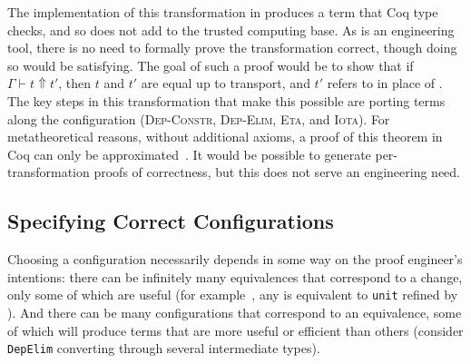 The implementation of this transformation in \toolname produces a term that Coq type checks, and so does not
add to the trusted computing base.
As \toolname is an engineering tool, there is no need to formally prove the transformation correct, though doing so would be satisfying.
The goal of such a proof would be to show that %
if $\Gamma \vdash t \Uparrow t'$,
then $t$ and $t'$ are equal up to transport, and $t'$ refers to \B in place of \A.
The key steps in this transformation that make this possible are porting terms along the configuration %
(\textsc{Dep-Constr}, \textsc{Dep-Elim}, \textsc{Eta}, and \textsc{Iota}).
For metatheoretical reasons, without additional axioms, a proof of this theorem in Coq can only be approximated~\cite{tabareau2017equivalences}.
It would be possible to generate per-transformation proofs of correctness, but this does not serve an engineering need.

\subsection{Specifying Correct Configurations}
\label{sec:art}


Choosing a configuration necessarily depends in some way on the proof engineer's intentions:
there can be infinitely many equivalences that correspond to a 
change, only some of which are useful (for example~\href{https://github.com/uwplse/pumpkin-pi/blob/silent/plugin/coq/playground/refine_unit.v}{}, any \A is equivalent to \lstinline{unit} refined by \A). %
And there can be many configurations that correspond
to an equivalence, some of which will produce terms that are more useful or efficient than others
(consider \lstinline{DepElim} converting through several intermediate types).

